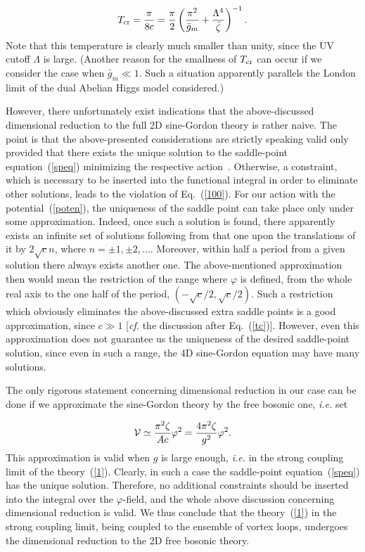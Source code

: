 \documentclass[a4paper,12pt]{article}
\begin{document}
\begin{equation}
\label{tc}
T_{\rm cr}=\frac{\pi}{8c}=\frac{\pi}{2}\left(\frac{\pi^2}{\bar g_m}+\frac{\Lambda^4}{\bar\zeta}\right)^{-1}.
\end{equation}
Note that this temperature is clearly much smaller than unity, since the UV cutoff $\Lambda$ is large.
(Another reason for the smallness of $T_{\rm cr}$ can occur if we consider the case when $\bar g_m\ll 1$.
Such a situation apparently parallels the London limit of the dual Abelian Higgs model considered.)

However, there unfortunately exist indications that the above-discussed dimensional reduction to the full 2D sine-Gordon theory
is rather naive. The point is that the above-presented 
considerations are strictly speaking valid only provided that there exists the unique solution to the saddle-point
equation~(\ref{speq}) minimizing the respective action~\cite{Parisi}. Otherwise, a constraint, which is
necessary to be inserted into the functional integral in order to eliminate other solutions, leads to the violation of Eq.~(\ref{100}).
For our action with the potential~(\ref{poten}), the uniqueness of the saddle point can take place only under some approximation. Indeed, once 
such a solution is found, there apparently exists an infinite set of solutions following from that one upon the translations
of it by $2\sqrt{c}n$, where $n=\pm 1, \pm 2,\ldots$. Moreover, within half a period from a given solution there always exists another one.
The above-mentioned approximation then would mean the restriction 
of the range where $\varphi$ is defined, from the whole real axis to the one half of the period, $(-\sqrt{c}/2,\sqrt{c}/2)$. 
Such a restriction which obviously eliminates the above-discussed extra saddle points is a good approximation, since $c\gg1$ 
[{\it cf.} the discussion after Eq.~(\ref{tc})]. However, even this approximation does not guarantee us the uniqueness of the 
desired saddle-point solution, since even in such a range, the 4D sine-Gordon equation may have many solutions. 

The only rigorous 
statement concerning dimensional reduction in our case can be done if we approximate the sine-Gordon theory by the 
free bosonic one, {\it i.e.} set 

$${\cal V}\simeq \frac{\pi^2\zeta}{Ac}\varphi^2=\frac{4\pi^2\zeta}{g^2}\varphi^2.$$ 
This approximation is valid when $g$ is large enough, {\it i.e.} in the strong coupling limit of the theory~(\ref{1}).
Clearly, in such a case the saddle-point equation~(\ref{speq}) has the unique solution. Therefore, no additional constraints should be 
inserted into the integral over the $\varphi$-field, and the whole above discussion 
concerning dimensional reduction is valid. We thus conclude that the theory~(\ref{1}) in the strong coupling limit,
being coupled to the ensemble of vortex loops, undergoes the dimensional reduction to the 2D free bosonic theory.
 
\end{document}
